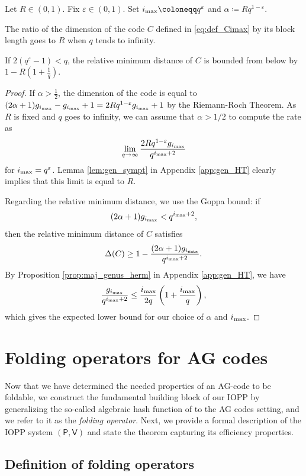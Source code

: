 \documentclass[10pt,a4paper]{article}
\renewcommand\epsilon{\varepsilon}
\newcommand\prover{\mathsf{P}}
\newcommand\verifier{\mathsf{V}}
\newcommand\mydef{\coloneqq}
\newcommand{\ii}{i_{\rm{max}}}
\theoremstyle{plain}
\theoremstyle{plain}
\theoremstyle{definition}
\theoremstyle{remark}
\theoremstyle{plain}
\begin{document}
\begin{lemma}\label{lem:limit-rate}
	Let $R \in (0,1)$. Fix $\epsilon \in (0,1)$. Set $\ii\mydef q^\epsilon$ and $\alpha \mydef R q^{1-\epsilon}$.
	
	The ratio of the dimension of the code $C$ defined in \eqref{eq:def_Cimax} by its block length goes to $R$ when $q$ tends to infinity. 
	
	If $2(q^\epsilon-1)<q$, the relative minimum distance of $C$ is bounded from below by $1-R\left(1+\frac{1}{q}\right)$.
\end{lemma}

\begin{proof}
	If $\alpha > \frac{1}{2}$, the dimension of the code is equal to $(2\alpha +1)g_{\ii}- g_{\ii}+1= 2Rq^{1-\epsilon}g_{\ii}+1$ by the Riemann-Roch Theorem. As $R$ is fixed and $q$ goes to infinity, we can assume that $\alpha > 1/2$ to compute the rate as
	\[\lim_{q \rightarrow \infty} \frac{2Rq^{1-\epsilon}g_{\ii}}{q^{\ii+2}}\]
	for $\ii=q^\epsilon$.
	Lemma \ref{lem:gen_sympt} in Appendix \ref{app:gen_HT} clearly implies that this limit is equal to $R$.
	
	Regarding the relative minimum distance, we use the Goppa bound: if \[(2\alpha + 1)g_{\ii} < q^{\ii+2},\] then the relative minimum distance of $C$ satisfies \[\Delta(C) \geq 1 - \frac{(2\alpha + 1)g_{\ii}}{q^{\ii+2}}.\] By Proposition \ref{prop:maj_genus_herm} in Appendix \ref{app:gen_HT}, we have
	\[ \frac{g_{\ii}}{q^{\ii+2}} \leq \frac{\ii}{2q}\left(1 + \frac{\ii}{q}\right),\]
	which gives the expected lower bound for our choice of $\alpha$ and $\ii$.
\end{proof}


\section{Folding operators for AG codes}\label{sec:iopp}

Now that we have determined the needed properties of an AG-code to be foldable, we construct the fundamental building block of our IOPP by generalizing the so-called algebraic hash function of \cite{BKS18} to the AG codes setting, and we refer to it as the \emph{folding operator}. Next, we provide a formal description of the IOPP system $(\prover, \verifier)$ and state the theorem capturing its efficiency properties.

\subsection{Definition of folding operators}\label{subsec:folding}
\end{document}
